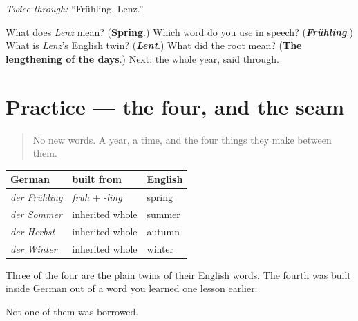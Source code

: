 \emph{Twice through:} \textquotedblleft{}Frühling, Lenz.\textquotedblright{}

\begin{tcolorbox}[breakable,colback=teal!4,colframe=teal!35!black,title={Before you move on}]
What does \emph{Lenz} mean? (\textbf{Spring}.) Which word do you use in speech? (\emph{\textbf{Frühling}}.) What is \emph{Lenz}'s English twin? (\emph{\textbf{Lent}}.) What did the root mean? (\textbf{The lengthening of the days}.) Next: the whole year, said through.
\end{tcolorbox}
\section[Practice]{Practice — the four, and the seam}

\label{lesson:GE-C09-jahreszeiten}



\begin{quote}
No new words. A year, a time, and the four things they make between them.
\end{quote}

\begin{grammarlens}[title={Grammar Lens: the four seasons}]
\noindent
\begin{tabularx}{\linewidth}{@{}>{\raggedright\arraybackslash}X>{\raggedright\arraybackslash}X>{\raggedright\arraybackslash}X@{}}
\toprule
\textbf{German} & \textbf{built from} & \textbf{English} \\
\midrule
\emph{der Frühling} & \emph{früh} + \emph{-ling} & spring \\
\emph{der Sommer} & inherited whole & summer \\
\emph{der Herbst} & inherited whole & autumn \\
\emph{der Winter} & inherited whole & winter \\
\bottomrule
\end{tabularx}

Three of the four are the plain twins of their English words. The fourth was built inside German out of a word you learned one lesson earlier.

Not one of them was borrowed.
\end{grammarlens}

